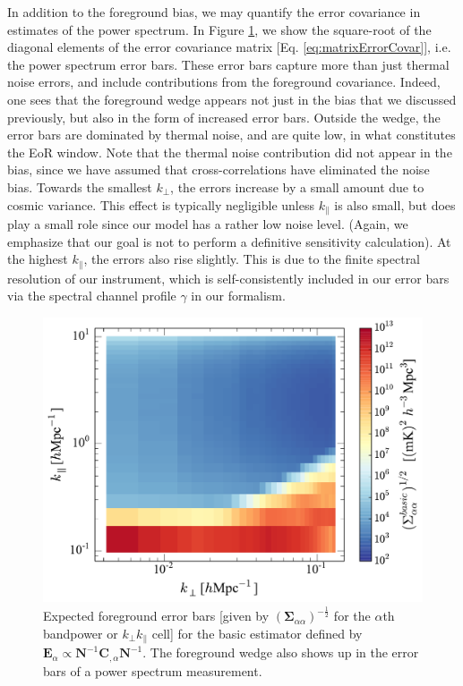 \documentclass[twocolumn,aps,prd,nofootinbib,showpacs]{revtex4-1}
\begin{document}
In addition to the foreground bias, we may quantify the error covariance in estimates of the power spectrum.  In Figure \ref{fig:basicEstErrorBars}, we show the square-root of the diagonal elements of the error covariance matrix [Eq. \eqref{eq:matrixErrorCovar}], i.e. the power spectrum error bars.  These error bars capture more than just thermal noise errors, and include contributions from the foreground covariance.  Indeed, one sees that the foreground wedge appears not just in the bias that we discussed previously, but also in the form of increased error bars.  Outside the wedge, the error bars are dominated by thermal noise, and are quite low, in what constitutes the EoR window.  Note that the thermal noise contribution did not appear in the bias, since we have assumed that cross-correlations have eliminated the noise bias.  Towards the smallest $k_\perp$, the errors increase by a small amount due to cosmic variance.  This effect is typically negligible unless $k_\parallel$ is also small, but does play a small role since our model has a rather low noise level.  (Again, we emphasize that our goal is not to perform a definitive sensitivity calculation).  At the highest $k_\parallel$, the errors also rise slightly.  This is due to the finite spectral resolution of our instrument, which is self-consistently included in our error bars via the spectral channel profile $\gamma$ in our formalism.

\begin{figure}[t] 
	\centering 
	\includegraphics[width=.49\textwidth]{figures/simpleEstErrorBars.pdf}
	\caption{Expected foreground error bars [given by $\left(\boldsymbol \Sigma_{\alpha\alpha}\right)^{-\frac{1}{2}}$ for the $\alpha$th bandpower or $k_\perp k_\parallel$ cell] for the basic estimator defined by $\mathbf{E}_\alpha \propto \mathbf{N}^{-1} \mathbf{C}_{,\alpha} \mathbf{N}^{-1}$.  The foreground wedge also shows up in the error bars of a power spectrum measurement.}
	\label{fig:basicEstErrorBars}
\end{figure}
\end{document}

